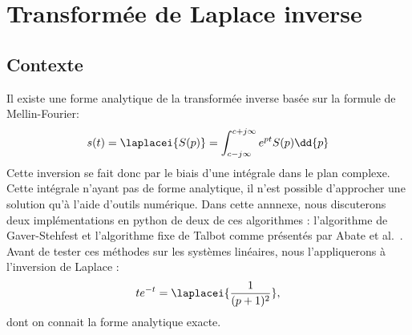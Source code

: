 \chapter{Transformée de Laplace inverse~\label{annexe-invL}}

\section{Contexte}
Il existe une forme analytique de la transformée inverse basée sur
la formule de Mellin-Fourier\cite{Ostertag}:
\[
s(t)=\laplacei{S(p)}=\int_{c-j\infty}^{c+j\infty} e^{pt}S(p)\dd{p}
\]
Cette inversion se fait donc par le biais d'une intégrale dans le plan
complexe. Cette intégrale n'ayant pas de forme analytique, il n'est possible 
d'approcher une solution qu'à l'aide d'outils numérique. 
Dans cette annnexe, nous discuterons deux implémentations en python de 
deux de ces algorithmes : 
l'algorithme de Gaver-Stehfest et l'algorithme fixe de Talbot comme présentés
par Abate et al.~\cite{abate2004,abate2006,frwiki:200676411}.
Avant de tester ces méthodes sur les systèmes linéaires, nous l'appliquerons
à l'inversion de Laplace :  
\[
    te^{-t}=\laplacei{\dfrac{1}{(p+1)^2}},
\]
dont on connait la forme analytique exacte.
